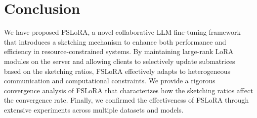 \documentclass{article} %
\theoremstyle{plain}
\theoremstyle{definition}
\begin{document}

\section{Conclusion}\label{sec:conclusion}

We have proposed FSLoRA, a novel collaborative LLM fine-tuning framework that introduces a sketching mechanism to enhance both performance and efficiency in resource-constrained systems. By maintaining large-rank LoRA modules on the server and allowing clients to selectively update submatrices based on the sketching ratios, FSLoRA effectively adapts to heterogeneous communication and computational constraints. We provide a rigorous convergence analysis of FSLoRA that characterizes how the sketching ratios affect the convergence rate. Finally, we confirmed the effectiveness of FSLoRA through extensive experiments across multiple datasets and models.
\end{document}
